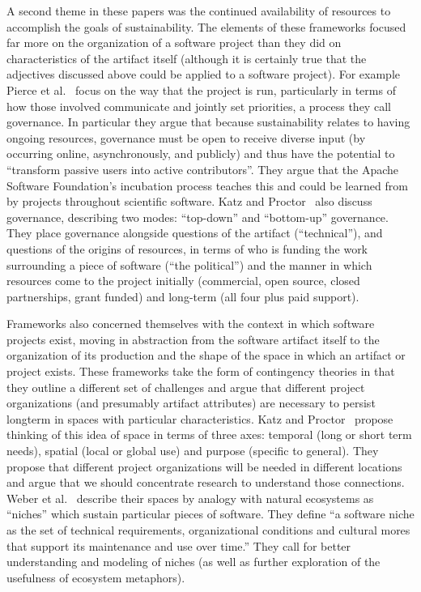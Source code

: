 \documentclass[11pt, oneside]{amsart}
\begin{document}
A second theme in these papers was the continued availability of
resources to accomplish the goals of sustainability. The elements of
these frameworks focused far more on the organization of a software
project than they did on characteristics of the artifact itself
(although it is certainly true that the adjectives discussed above
could be applied to a software project). For example Pierce et
al.~\cite{Pierce_WSSSPE} focus on the way that the project is run,
particularly in terms of how those involved communicate and jointly
set priorities, a process they call governance. In particular they
argue that because sustainability relates to having ongoing resources,
governance must be open to receive diverse input (by occurring online,
asynchronously, and publicly) and thus have the potential to
``transform passive users into active contributors''. They argue that
the Apache Software Foundation's incubation process teaches this and
could be learned from by projects throughout scientific software.
Katz and Proctor~\cite{Katz_WSSSPE} also discuss governance,
describing two modes: ``top-down'' and ``bottom-up'' governance.  They
place governance alongside questions of the artifact (``technical''),
and questions of the origins of resources, in terms of who is funding
the work surrounding a piece of software (``the political'') and the
manner in which resources come to the project initially (commercial,
open source, closed partnerships, grant funded) and long-term (all
four plus paid support).

Frameworks also concerned themselves with the context in which software
projects exist, moving in abstraction from the software artifact
itself to the organization of its production and
the shape of the space in which an artifact or project exists.
These frameworks take the form of contingency theories in that
they outline a different set of challenges and argue that different
project organizations (and presumably artifact attributes) are
necessary to persist longterm in spaces with particular
characteristics.  Katz and Proctor~\cite{Katz_WSSSPE} propose thinking
of this idea of space in terms of three axes: temporal (long or short
term needs), spatial (local or global use) and purpose (specific to
general).  They propose that different project organizations will be
needed in different locations and argue that we should concentrate
research to understand those connections. Weber et
al.~\cite{Weber_WSSSPE} describe their spaces by analogy with natural
ecosystems as ``niches'' which sustain particular pieces of
software. They define ``a software niche as the set of technical
requirements, organizational conditions and cultural mores that
support its maintenance and use over time.'' They call for better
understanding and modeling of niches (as well as further exploration
of the usefulness of ecosystem metaphors).
\end{document}
